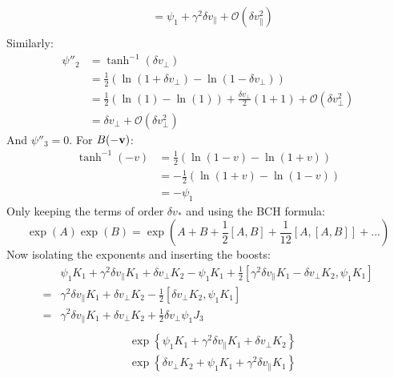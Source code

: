 \documentclass[12pt,a4]{article}
\begin{document}
\begin{enumerate}
\begin{enumerate}
\begin{align*}
                  &= \psi_1 + \gamma^2 \delta v_\parallel + \mathcal{O}(\delta v_\parallel^2)\\
        \end{align*}
        Similarly:
        \begin{align*}
          \psi''_2 &= \tanh^{-1}(\delta v_\perp) \\
                  &= \frac{1}{2}\left(\ln(1 + \delta v_\perp) - \ln(1 - \delta v_\perp)\right)\\
                  &= \frac{1}{2}\left(\ln(1) - \ln(1)\right) + \frac{\delta v_\perp}{2}\left(1 + 1\right) + \mathcal{O}(\delta v_\perp^2)\\
                  &= \delta v_\perp + \mathcal{O}(\delta v_\perp^2)
        \end{align*}
        And $\psi''_3 = 0$.
        For $B(-{\bf v})$:
        \begin{align*}
          \tanh^{-1}(-v )
                  &= \frac{1}{2}\left(\ln(1 - v ) - \ln(1 + v )\right)\\
                  &= - \frac{1}{2}\left(\ln(1 + v ) - \ln(1 - v )\right)\\
                  &= - \psi_1
        \end{align*}
        Only keeping the terms of order $\delta v_*$ and using the BCH formula:
        \begin{equation*}
          \exp (A) \exp(B) = \exp(A + B + \frac{1}{2}[A, B] + \frac{1}{12}[A, [A, B]] + ...)
        \end{equation*}
        Now isolating the exponents and inserting the boosts:
        \begin{align*}
          &\psi_1 K_1 + \gamma^2 \delta v_\parallel K_1 + \delta v_\perp K_2 - \psi_1 K_1 + \frac{1}{2} \left[\gamma^2 \delta v_\parallel K_1 - \delta v_\perp K_2, \psi_1 K_1\right]\\
          =&  \gamma^2\delta v_\parallel K_1 +  \delta v_\perp K_2  - \frac{1}{2} \left[ \delta v_\perp K_2, \psi_1 K_1\right]\\
          =&  \gamma^2\delta v_\parallel K_1 +  \delta v_\perp K_2  + \frac{1}{2} \delta v_\perp \psi_1 J_3\\
        \end{align*}
        \begin{align*}
          &\exp\left\{\psi_1 K_1 + \gamma^2 \delta v_\parallel K_1 + \delta v_\perp K_2 \right\}\\
          &\exp\left\{\delta v_\perp K_2 + \psi_1 K_1 + \gamma^2 \delta v_\parallel K_1 \right\}\\

\end{align*}
\end{enumerate}
\end{enumerate}
\end{document}
